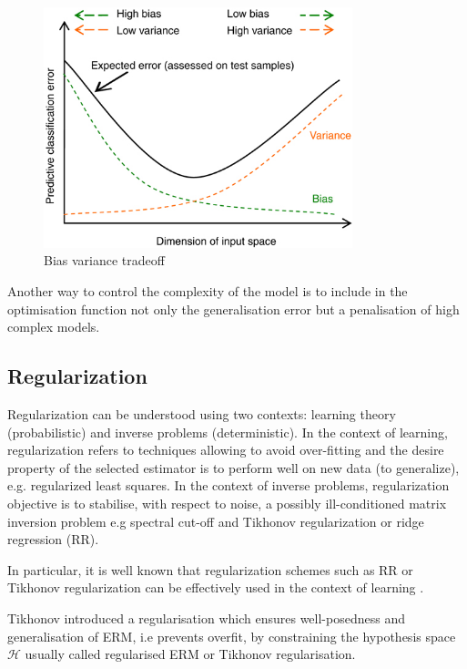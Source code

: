 \begin{figure}[!h]
  \centering
  \includegraphics[width=0.8\textwidth]{img/biasvariancetradeoff}
  \caption{Bias variance tradeoff}
  \label{fig:bvtradeoff}
\end{figure}

Another way to control the complexity of the model is to include in the optimisation function not only the generalisation error but a penalisation of high complex models. 


\subsection{Regularization}

Regularization can be understood using two contexts: learning theory (probabilistic) and inverse problems (deterministic). In the context of learning, regularization refers to techniques allowing to avoid over-fitting and the desire property of the selected estimator is to perform well on new data (to generalize), e.g. regularized least squares. In the context of inverse problems, regularization objective is to stabilise, with respect to noise, a possibly ill-conditioned matrix inversion problem e.g spectral cut-off and Tikhonov regularization or ridge regression (RR)\cite{ tikhonov1977}.

In particular, it is well known that regularization schemes such as RR or Tikhonov regularization can be effectively used in the context of learning \cite{vito2005}.

Tikhonov introduced a regularisation which ensures well-posedness and generalisation of ERM, i.e prevents overfit, by constraining the hypothesis space $\mathcal{H}$ usually called regularised ERM or Tikhonov regularisation.

